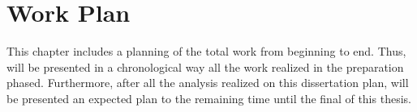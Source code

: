 \chapter{Work Plan}
\label{cha:work_plan}
This chapter includes a planning of the total work from beginning to end. 
Thus, will be presented in a chronological way all the work realized in the 
preparation phased. Furthermore, after all the analysis realized on this 
dissertation plan, will be presented an expected plan to the remaining 
time until the final of this thesis.
